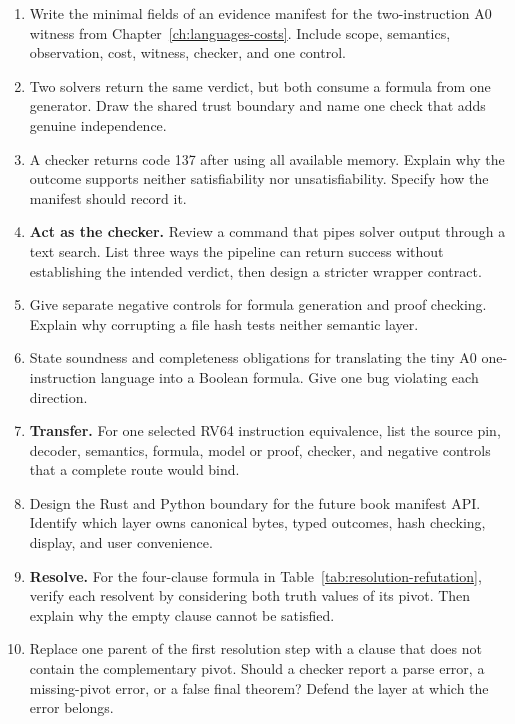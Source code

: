 \begin{enumerate}
\item Write the minimal fields of an evidence manifest for the two-instruction
A0 witness from Chapter~\ref{ch:languages-costs}. Include scope, semantics,
observation, cost, witness, checker, and one control.

\item Two solvers return the same verdict, but both consume a formula from one
generator. Draw the shared trust boundary and name one check that adds genuine
independence.

\item A checker returns code 137 after using all available memory. Explain why
the outcome supports neither satisfiability nor unsatisfiability. Specify how
the manifest should record it.

\item \textbf{Act as the checker.} Review a command that pipes solver output
through a text search. List three ways the pipeline can return success without
establishing the intended verdict, then design a stricter wrapper contract.

\item Give separate negative controls for formula generation and proof
checking. Explain why corrupting a file hash tests neither semantic layer.

\item State soundness and completeness obligations for translating the tiny
A0 one-instruction language into a Boolean formula. Give one bug violating
each direction.

\item \textbf{Transfer.} For one selected RV64 instruction equivalence, list
the source pin, decoder, semantics, formula, model or proof, checker, and
negative controls that a complete route would bind.

\item Design the Rust and Python boundary for the future book manifest API.
Identify which layer owns canonical bytes, typed outcomes, hash checking,
display, and user convenience.

\item \textbf{Resolve.} For the four-clause formula in
Table~\ref{tab:resolution-refutation}, verify each resolvent by considering
both truth values of its pivot. Then explain why the empty clause cannot be
satisfied.

\item Replace one parent of the first resolution step with a clause that does
not contain the complementary pivot. Should a checker report a parse error, a
missing-pivot error, or a false final theorem? Defend the layer at which the
error belongs.


\end{enumerate}
